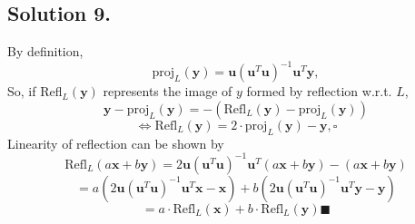 \documentclass{article}
\begin{document}
\subsection*{Solution 9.}
By definition, 
\[\text{proj}_L(\mathbf{y})=\mathbf{u}(\mathbf{u}^T\mathbf{u})^{-1}\mathbf{u}^T\mathbf{y},\]
So, if Refl$_{L}(\mathbf{y})$ represents the image of $y$ formed by reflection w.r.t. $L$,
\[\mathbf{y}-\text{proj}_L(\mathbf{y})=-(\text{Refl}_L(\mathbf{y})-\text{proj}_L(\mathbf{y}))\]
\[\Leftrightarrow \text{Refl}_L(\mathbf{y})=2\cdot \text{proj}_L(\mathbf{y})-\mathbf{y},\square\]
Linearity of reflection can be shown by 
\[\text{Refl}_L(a\mathbf{x}+b\mathbf{y})=2\mathbf{u}(\mathbf{u}^T\mathbf{u})^{-1}\mathbf{u}^T(a\mathbf{x}+b\mathbf{y})-(a\mathbf{x}+b\mathbf{y})\]
\[=a(2\mathbf{u}(\mathbf{u}^T\mathbf{u})^{-1}\mathbf{u}^T\mathbf{x}-\mathbf{x})+b(2\mathbf{u}(\mathbf{u}^T\mathbf{u})^{-1}\mathbf{u}^T\mathbf{y}-\mathbf{y})\]
\[=a\cdot \text{Refl}_L(\mathbf{x})+b\cdot \text{Refl}_L(\mathbf{y})\blacksquare\]
\end{document}
